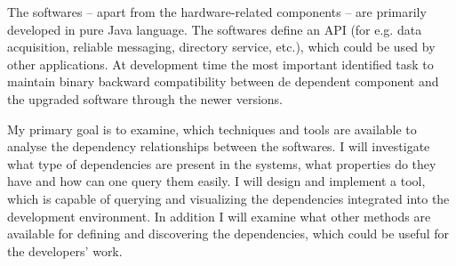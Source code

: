 The softwares – apart from the hardware-related components – are primarily
developed in pure Java language. The softwares define an API (for e.g. data
acquisition, reliable messaging, directory service, etc.), which could be used
by other applications. At development time the most important identified task 
to maintain binary backward compatibility between de dependent component and 
the upgraded software through the newer versions.

My primary goal is to examine, which techniques and tools are available to analyse 
the dependency relationships between the softwares. I will investigate what type 
of dependencies are present in the systems, what properties do they have and how 
can one query them easily. I will design and implement a tool, which is capable
 of querying and visualizing the dependencies integrated into the development 
 environment. In addition I will examine what other methods are available for 
 defining and discovering the dependencies, which could be useful for the
 developers' work.

\vfill


